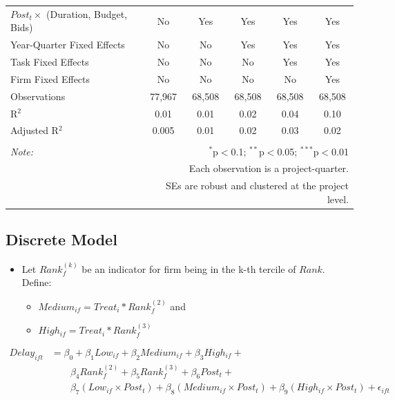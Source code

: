 \documentclass[
]{article}
\providecommand{\tightlist}{%
  \setlength{\itemsep}{0pt}\setlength{\parskip}{0pt}}
\begin{document}
\begin{table}[H]
\begin{tabular}{@{\extracolsep{-2pt}}lccccc}
$Post_t \times$  (Duration, Budget, Bids) & No & Yes & Yes & Yes & Yes \\ 
Year-Quarter Fixed Effects & No & No & Yes & Yes & Yes \\ 
Task Fixed Effects & No & No & No & Yes & Yes \\ 
Firm Fixed Effects & No & No & No & No & Yes \\ 
Observations & 77,967 & 68,508 & 68,508 & 68,508 & 68,508 \\ 
R$^{2}$ & 0.01 & 0.01 & 0.02 & 0.04 & 0.10 \\ 
Adjusted R$^{2}$ & 0.005 & 0.01 & 0.02 & 0.03 & 0.02 \\ 
\hline 
\hline \\[-1.8ex] 
\textit{Note:}  & \multicolumn{5}{r}{$^{*}$p$<$0.1; $^{**}$p$<$0.05; $^{***}$p$<$0.01} \\ 
 & \multicolumn{5}{r}{Each observation is a project-quarter.} \\ 
 & \multicolumn{5}{r}{SEs are robust and clustered at the project level.} \\ 
\end{tabular} 
\end{table}

\hypertarget{discrete-model}{%
\subsection{Discrete Model}\label{discrete-model}}

\begin{itemize}
\tightlist
\item
  Let \(Rank_f^{(k)}\) be an indicator for firm being in the k-th
  tercile of \(Rank\). Define:

  \begin{itemize}
  \tightlist
  \item
    \(Medium_{if}=Treat_i*Rank_f^{(2)}\) and
  \item
    \(High_{if} = Treat_i*Rank_f^{(3)}\)
  \end{itemize}
\end{itemize}

\[\begin{aligned} Delay_{ift} &= \beta_0+\beta_1 Low_{if}+\beta_2 Medium_{if}+\beta_3 High_{if} +\\  & \qquad  \beta_4 Rank_f^{(2)} + \beta_5 Rank_f^{(3)}+ \beta_6 Post_t + \\& \qquad \beta_7 (Low_{if} \times Post_t) + \beta_8 (Medium_{if} \times Post_t) + \beta_9 (High_{if} \times Post_t) + \epsilon_{ift} \end{aligned}\]
\end{document}
